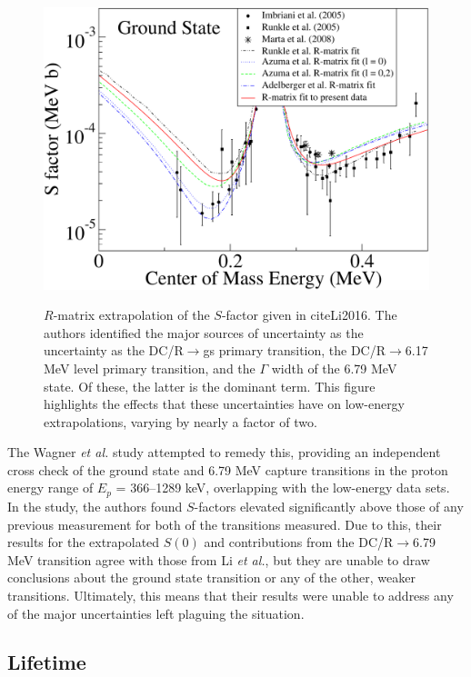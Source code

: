\begin{figure}
\includegraphics[width=\linewidth]{figures/qianSfactor.pdf}
\label{fig: QianRmatrix}
\caption{$R$-matrix extrapolation of the $S$-factor given in cite{Li2016}. The authors identified the major sources of uncertainty as the uncertainty as the DC/R$\rightarrow$gs primary transition, the DC/R$\rightarrow$6.17 MeV level primary transition, and the $\Gamma$ width of the 6.79 MeV state. Of these, the latter is the dominant term. This figure highlights the effects that these uncertainties have on low-energy extrapolations, varying by nearly a factor of two. }
\end{figure}

The Wagner \textit{et al.} study attempted to remedy this, providing an independent cross check of the ground state and 6.79 MeV capture transitions in the proton energy range of $E_{p}$ = 366–1289 keV, overlapping with the low-energy data sets. In the study, the authors found $S$-factors elevated significantly above those of any previous measurement for both of the transitions measured. Due to this, their results for the extrapolated $S(0)$ and contributions from the DC/R$\rightarrow$6.79 MeV transition agree with those from Li \textit{et al.}, but they are unable to draw conclusions about the ground state transition or any of the other, weaker transitions. Ultimately, this means that their results were unable to address any of the major uncertainties left plaguing the situation. 



\subsection{Lifetime}


